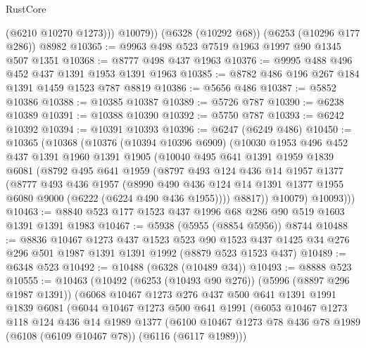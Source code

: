 \begin{lexlean}{RustCore}
\begin{coremodule}
            (@6210 @10270 @1273)))
        @10079))
    (@6328 (@10292 @68))
    (@6253 (@10296 @177 @286))
    @8982
@10365 := @9963 @498 @523 @7519 @1963 @1997 @90 @1345 @507 @1351
@10368 := @8777 @498 @437 @1963
@10376 := @9995 @488 @496 @452 @437 @1391 @1953 @1391 @1963
@10385 := @8782 @486 @196 @267 @184 @1391 @1459 @1523 @787 @8819
@10386 := @5656 @486
@10387 := @5852 @10386
@10388 := @10385 @10387
@10389 := @5726 @787
@10390 := @6238 @10389
@10391 := @10388 @10390
@10392 := @5750 @787
@10393 := @6242 @10392
@10394 := @10391 @10393
@10396 := @6247 (@6249 @486)
@10450 := @10365
    (@10368
      (@10376
        (@10394 @10396 @6909)
        (@10030
          @1953
          @496
          @452
          @437
          @1391
          @1960
          @1391
          @1905
          (@10040
            @495
            @641
            @1391
            @1959
            @1839
            @6081
            (@8792
              @495
              @641
              @1959
              (@8797
                @493
                @124
                @436
                @14
                @1957
                @1377
                (@8777
                  @493
                  @436
                  @1957
                  (@8990
                    @490
                    @436
                    @124
                    @14
                    @1391
                    @1377
                    @1955
                    @6080
                    @9000
                    (@6222 (@6224 @490 @436 @1955))))
                @8817))
            @10079)
          @10093)))
@10463 := @8840 @523 @177 @1523 @437 @1996 @68 @286 @90 @519 @1603 @1391 @1391 @1983
@10467 := @5938 (@5955 (@8854 @5956)) @8744
@10488 := @8836
    @10467
    @1273
    @437
    @1523
    @523
    @90
    @1523
    @437
    @1425
    @34
    @276
    @296
    @501
    @1987
    @1391
    @1391
    @1992
    (@8879 @523 @1523 @437)
@10489 := @6348 @523
@10492 := @10488 (@6328 (@10489 @34))
@10493 := @8888 @523
@10555 := @10463
    (@10492
      (@6253 (@10493 @90 @276))
      (@5996 (@8897 @296 @1987 @1391))
      (@6068
        @10467
        @1273
        @276
        @437
        @500
        @641
        @1391
        @1991
        @1839
        @6081
        (@6044
          @10467
          @1273
          @500
          @641
          @1991
          (@6053
            @10467
            @1273
            @118
            @124
            @436
            @14
            @1989
            @1377
            (@6100 @10467 @1273 @78 @436 @78 @1989 (@6108 (@6109 @10467 @78)) (@6116 (@6117 @1989)))

\end{coremodule}
\end{lexlean}

